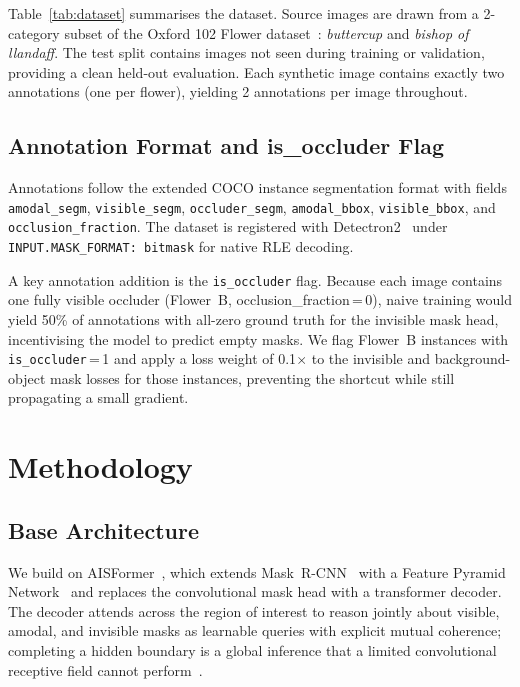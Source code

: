 \documentclass[conference]{IEEEtran}
\begin{document}
Table~\ref{tab:dataset} summarises the dataset.
Source images are drawn from a 2-category subset of the Oxford 102 Flower
dataset~\cite{nilsback2008flower,oxford102flower}: \textit{buttercup} and
\textit{bishop of llandaff}.
The test split contains images not seen during training or validation,
providing a clean held-out evaluation.
Each synthetic image contains exactly two annotations (one per flower),
yielding 2 annotations per image throughout.

\subsection{Annotation Format and is\_occluder Flag}

Annotations follow the extended COCO instance segmentation format with
fields \texttt{amodal\_segm}, \texttt{visible\_segm}, \texttt{occluder\_segm},
\texttt{amodal\_bbox}, \texttt{visible\_bbox}, and \texttt{occlusion\_fraction}.
The dataset is registered with Detectron2~\cite{wu2019detectron2} under
\texttt{INPUT.MASK\_FORMAT: bitmask} for native RLE decoding.

A key annotation addition is the \texttt{is\_occluder} flag.
Because each image contains one fully visible occluder (Flower~B,
occlusion\_fraction\,=\,0), naive training would yield 50\% of annotations
with all-zero ground truth for the invisible mask head, incentivising the
model to predict empty masks.
We flag Flower~B instances with \texttt{is\_occluder}\,=\,1 and apply a
loss weight of 0.1$\times$ to the invisible and background-object mask losses
for those instances, preventing the shortcut while still propagating a
small gradient.

\section{Methodology}
\label{sec:method}

\subsection{Base Architecture}

We build on AISFormer~\cite{tran2022aisformer}, which extends
Mask~R-CNN~\cite{he2017mask} with a Feature Pyramid Network~\cite{lin2017fpn}
and replaces the convolutional mask head with a transformer decoder.
The decoder attends across the region of interest to reason jointly about
visible, amodal, and invisible masks as learnable queries with explicit mutual
coherence; completing a hidden boundary is a global inference that a limited
convolutional receptive field cannot perform~\cite{cheng2022mask2former}.
\end{document}
